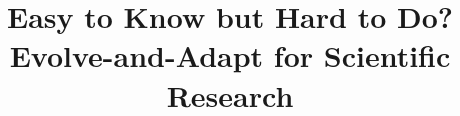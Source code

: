 \documentclass[manuscript,review,anonymous]{acmart}
\begin{document}
\title{Easy to Know but Hard to Do? Evolve-and-Adapt for Scientific Research}









\end{document}
